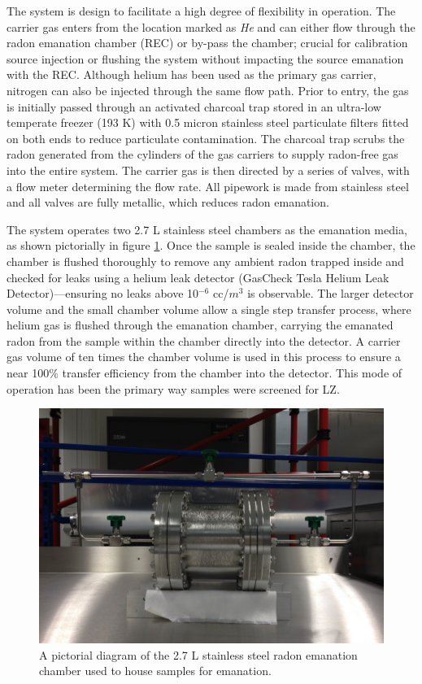 The system is design to facilitate a high degree of flexibility in operation. The carrier gas enters from the location marked as \textit{He} and can either flow through the radon emanation chamber (REC) or by-pass the chamber; crucial for calibration source injection or flushing the system without impacting the source emanation with the REC. Although helium has been used as the primary gas carrier, nitrogen can also be injected through the same flow path. Prior to entry, the gas is initially passed through an activated charcoal trap stored in an ultra-low temperate freezer (193 K) with 0.5 micron stainless steel particulate filters fitted on both ends to reduce particulate contamination. The charcoal trap scrubs the radon generated from the cylinders of the gas carriers to supply radon-free gas into the entire system. The carrier gas is then directed by a series of valves, with a flow meter determining the flow rate. All pipework is made from stainless steel and all valves are fully metallic, which reduces radon emanation.

The system operates two 2.7 L stainless steel chambers as the emanation media, as shown pictorially in figure \ref{fig:detector_chamber}. Once the sample is sealed inside the chamber, the chamber is flushed thoroughly to remove any ambient radon trapped inside and checked for leaks using a helium leak detector (GasCheck Tesla Helium Leak Detector)---ensuring no leaks above 10$^{−6}$ cc/$m^3$ is observable. The larger detector volume and the small chamber volume allow a single step transfer process, where helium gas is flushed through the emanation chamber, carrying the emanated radon from the sample within the chamber directly into the detector. A carrier gas volume of ten times the chamber volume is used in this process to ensure a near 100\% transfer efficiency from the chamber into the detector. This mode of operation has been the primary way samples were screened for LZ.
%
\begin{figure}[]
    \centering
    \includegraphics[scale=0.4]{Chapter_4/Figures/radon_system_chamber.png}
    \caption[A pictorial diagram of the 2.7 L stainless steel radon emanation chamber used to house samples for emanation.]
    {A pictorial diagram of the 2.7 L stainless steel radon emanation chamber used to house samples for emanation.}
    \label{fig:detector_chamber}
\end{figure}
%


